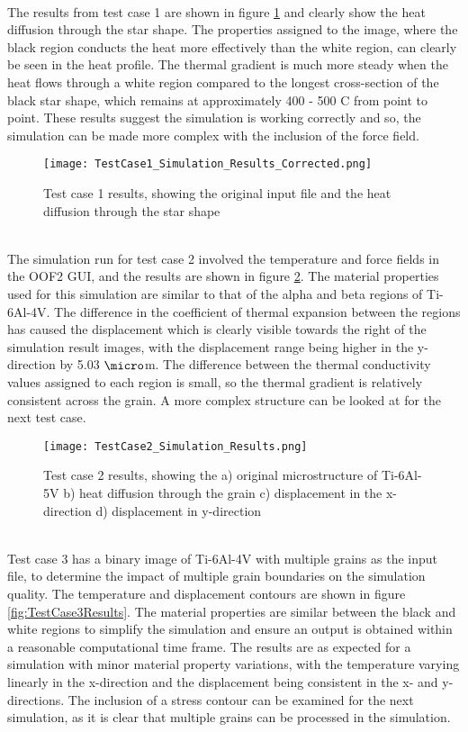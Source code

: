 \documentclass[report.tex]{subfiles}
\begin{document}
\\
The results from test case 1 are shown in figure \ref{fig:TestCase1Results} and clearly show the heat diffusion through the star shape. The properties assigned to the image, where the black region conducts the heat more effectively than the white region, can clearly be seen in the heat profile. The thermal gradient is much more steady when the heat flows through a white region compared to the longest cross-section of the black star shape, which remains at approximately 400 - 500 \degree C from point to point. These results suggest the simulation is working correctly and so, the simulation can be made more complex with the inclusion of the force field.
\\
\begin{figure}[h]
    \centering
    \texttt{[image: TestCase1\_Simulation\_Results\_Corrected.png]}
    \caption{Test case 1 results, showing the original input file and the heat diffusion through the star shape}
    \label{fig:TestCase1Results}
\end{figure}
\\
The simulation run for test case 2 involved the temperature and force fields in the OOF2 GUI, and the results are shown in figure \ref{fig:TestCase2Results}. The material properties used for this simulation are similar to that of the alpha and beta regions of Ti-6Al-4V. The difference in the coefficient of thermal expansion between the regions has caused the displacement which is clearly visible towards the right of the simulation result images, with the displacement range being higher in the y-direction by 5.03 $\micro$m. The difference between the thermal conductivity values assigned to each region is small, so the thermal gradient is relatively consistent across the grain. A more complex structure can be looked at for the next test case.
\\
\begin{figure}[htp]
    \centering
    \texttt{[image: TestCase2\_Simulation\_Results.png]}
    \caption{Test case 2 results, showing the a) original microstructure of Ti-6Al-5V b) heat diffusion through the grain c) displacement in the x-direction d) displacement in y-direction}
    \label{fig:TestCase2Results}
\end{figure}
\\
Test case 3 has a binary image of Ti-6Al-4V with multiple grains as the input file, to determine the impact of multiple grain boundaries on the simulation quality. The temperature and displacement contours are shown in figure \ref{fig:TestCase3Results}. The material properties are similar between the black and white regions to simplify the simulation and ensure an output is obtained within a reasonable computational time frame. The results are as expected for a simulation with minor material property variations, with the temperature varying linearly in the x-direction and the displacement being consistent in the x- and y-directions. The inclusion of a stress contour can be examined for the next simulation, as it is clear that multiple grains can be processed in the simulation.
\end{document}
